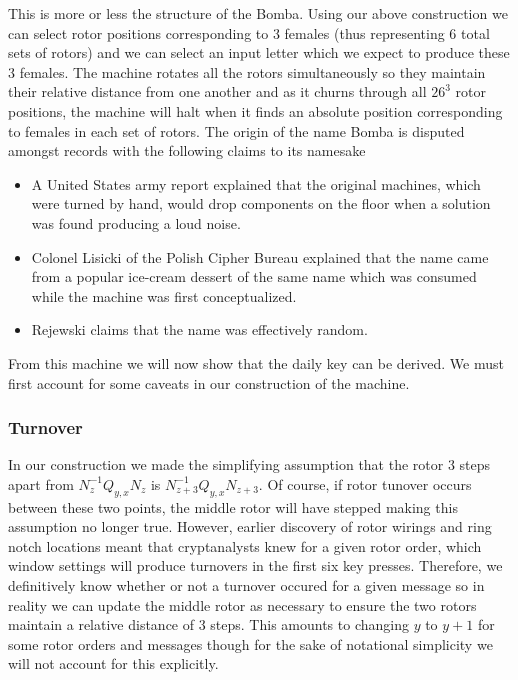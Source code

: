 \noindent This is more or less the structure of the Bomba. Using our
above construction we can select rotor positions corresponding to 3
females (thus representing 6 total sets of rotors) and we can select
an input letter which we expect to produce these 3 females. The
machine rotates all the rotors simultaneously so they maintain their
relative distance from one another and as it churns through all
$26^3$ rotor positions, the machine will halt when it finds an
absolute position corresponding to females in each set of rotors. The origin of the name Bomba is disputed amongst records with the following claims to its namesake
\begin{itemize}
	\item A United States army report explained that the original machines, which were turned by hand, would drop components on the floor when a solution was found producing a loud noise.
	\item Colonel Lisicki of the Polish Cipher Bureau explained that the name came from a popular ice-cream dessert of the same name which was consumed while the machine was first conceptualized.
	\item Rejewski claims that the name was effectively random.
\end{itemize}
From this machine we will now show that the daily key can be derived.
We must first account for some caveats in our construction of the machine.

\subsubsection{Turnover}
In our construction we made the simplifying assumption that the rotor
3 steps apart from $N_{z}^{-1}Q_{y,x}N_{z}$ is
$N_{z+3}^{-1}Q_{y,x}N_{z+3}$. Of course, if rotor tunover occurs
between these two points, the middle rotor will have stepped making
this assumption no longer true. However, earlier discovery of rotor
wirings and ring notch locations meant that cryptanalysts knew for a
given rotor order, which window settings will produce turnovers in
the first six key presses. Therefore, we definitively know whether or
not a turnover occured for a given message so in reality we can
update the middle rotor as necessary to ensure the two rotors
maintain a relative distance of 3 steps. This amounts to changing $y$
to $y+1$ for some rotor orders and messages though for the sake of notational simplicity we will not account for this explicitly.
